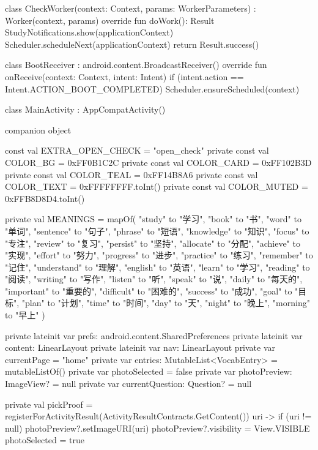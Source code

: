 class CheckWorker(context: Context, params: WorkerParameters) : Worker(context, params) {
    override fun doWork(): Result {
        StudyNotifications.show(applicationContext)
        Scheduler.scheduleNext(applicationContext)
        return Result.success()
    }
}

class BootReceiver : android.content.BroadcastReceiver() {
    override fun onReceive(context: Context, intent: Intent) {
        if (intent.action == Intent.ACTION_BOOT_COMPLETED) Scheduler.ensureScheduled(context)
    }
}

class MainActivity : AppCompatActivity() {

    companion object {
        const val EXTRA_OPEN_CHECK = "open_check"
        private const val COLOR_BG = 0xFF0B1C2C
        private const val COLOR_CARD = 0xFF102B3D
        private const val COLOR_TEAL = 0xFF14B8A6
        private const val COLOR_TEXT = 0xFFFFFFFF.toInt()
        private const val COLOR_MUTED = 0xFFB8D8D4.toInt()

        private val MEANINGS = mapOf(
            "study" to "学习", "book" to "书", "word" to "单词", "sentence" to "句子",
            "phrase" to "短语", "knowledge" to "知识", "focus" to "专注", "review" to "复习",
            "persist" to "坚持", "allocate" to "分配", "achieve" to "实现", "effort" to "努力",
            "progress" to "进步", "practice" to "练习", "remember" to "记住", "understand" to "理解",
            "english" to "英语", "learn" to "学习", "reading" to "阅读", "writing" to "写作",
            "listen" to "听", "speak" to "说", "daily" to "每天的", "important" to "重要的",
            "difficult" to "困难的", "success" to "成功", "goal" to "目标", "plan" to "计划",
            "time" to "时间", "day" to "天", "night" to "晚上", "morning" to "早上"
        )
    }

    private lateinit var prefs: android.content.SharedPreferences
    private lateinit var content: LinearLayout
    private lateinit var nav: LinearLayout
    private var currentPage = "home"
    private var entries: MutableList<VocabEntry> = mutableListOf()
    private var photoSelected = false
    private var photoPreview: ImageView? = null
    private var currentQuestion: Question? = null

    private val pickProof = registerForActivityResult(ActivityResultContracts.GetContent()) { uri ->
        if (uri != null) {
            photoPreview?.setImageURI(uri)
            photoPreview?.visibility = View.VISIBLE
            photoSelected = true
        }
    }

}
